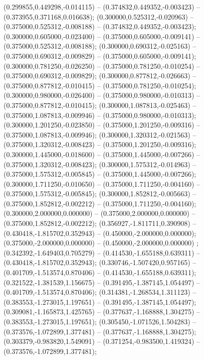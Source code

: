  (0.299855,0.449298,-0.014115) -- (0.374832,0.449352,-0.003423) -- (0.373955,0.371168,0.016638);
 (0.300000,0.525312,-0.020963) -- (0.375000,0.525312,-0.008188) -- (0.374832,0.449352,-0.003423);
 (0.300000,0.605000,-0.023400) -- (0.375000,0.605000,-0.009141) -- (0.375000,0.525312,-0.008188);
 (0.300000,0.690312,-0.025163) -- (0.375000,0.690312,-0.009829) -- (0.375000,0.605000,-0.009141);
 (0.300000,0.781250,-0.026250) -- (0.375000,0.781250,-0.010254) -- (0.375000,0.690312,-0.009829);
 (0.300000,0.877812,-0.026663) -- (0.375000,0.877812,-0.010415) -- (0.375000,0.781250,-0.010254);
 (0.300000,0.980000,-0.026400) -- (0.375000,0.980000,-0.010313) -- (0.375000,0.877812,-0.010415);
 (0.300000,1.087813,-0.025463) -- (0.375000,1.087813,-0.009946) -- (0.375000,0.980000,-0.010313);
 (0.300000,1.201250,-0.023850) -- (0.375000,1.201250,-0.009316) -- (0.375000,1.087813,-0.009946);
 (0.300000,1.320312,-0.021563) -- (0.375000,1.320312,-0.008423) -- (0.375000,1.201250,-0.009316);
 (0.300000,1.445000,-0.018600) -- (0.375000,1.445000,-0.007266) -- (0.375000,1.320312,-0.008423);
 (0.300000,1.575312,-0.014963) -- (0.375000,1.575312,-0.005845) -- (0.375000,1.445000,-0.007266);
 (0.300000,1.711250,-0.010650) -- (0.375000,1.711250,-0.004160) -- (0.375000,1.575312,-0.005845);
 (0.300000,1.852812,-0.005663) -- (0.375000,1.852812,-0.002212) -- (0.375000,1.711250,-0.004160);
 (0.300000,2.000000,0.000000) -- (0.375000,2.000000,0.000000) -- (0.375000,1.852812,-0.002212);
 (0.356927,-1.811711,0.390908) -- (0.430418,-1.815702,0.352943) -- (0.450000,-2.000000,0.000000);
 (0.375000,-2.000000,0.000000) -- (0.450000,-2.000000,0.000000) ;
 (0.342392,-1.649403,0.705279) -- (0.414530,-1.655188,0.639311) -- (0.430418,-1.815702,0.352943);
 (0.330746,-1.507420,0.957165) -- (0.401709,-1.513574,0.870406) -- (0.414530,-1.655188,0.639311);
 (0.321522,-1.381539,1.156675) -- (0.391495,-1.387145,1.054497) -- (0.401709,-1.513574,0.870406);
 (0.314381,-1.268534,1.311123) -- (0.383553,-1.273015,1.197651) -- (0.391495,-1.387145,1.054497);
 (0.309081,-1.165873,1.425765) -- (0.377637,-1.168888,1.304275) -- (0.383553,-1.273015,1.197651);
 (0.305450,-1.071526,1.504283) -- (0.373576,-1.072899,1.377481) -- (0.377637,-1.168888,1.304275);
 (0.303379,-0.983820,1.549091) -- (0.371254,-0.983500,1.419324) -- (0.373576,-1.072899,1.377481);
